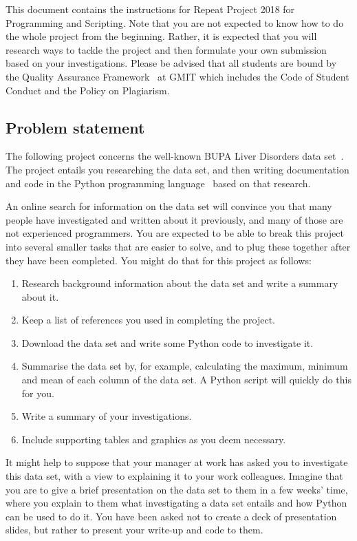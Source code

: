 \documentclass[12pt, a4paper, hidelinks]{scrartcl}
\title{\projectname}
\author{\modulename}
\date{Due: \duedate}
\newcommand{\modulename}{Programming and Scripting}
\newcommand{\projectyear}{2018}
\newcommand{\projectname}{Repeat Project \projectyear}
\begin{document}
  
\maketitle

\noindent
This document contains the instructions for \projectname{} for \modulename{}.
Note that you are not expected to know how to do the whole project from the beginning.
Rather, it is expected that you will research ways to tackle the project and then formulate your own submission based on your investigations.
Please be advised that all students are bound by the Quality Assurance Framework~\cite{gmitqaf} at GMIT which includes the Code of Student Conduct and the Policy on Plagiarism.

\subsection*{Problem statement}
  The following project concerns the well-known BUPA Liver Disorders data set~\cite{liverdataset}.
  The project entails you researching the data set, and then writing documentation and code in the Python programming language~\cite{pythonwebsite} based on that research.
  
  An online search for information on the data set will convince you that many people have investigated and written about it previously, and many of those are not experienced programmers.
  You are expected to be able to break this project into several smaller tasks that are easier to solve, and to plug these together after they have been completed.
  You might do that for this project as follows:
  \begin{enumerate}
    \item Research background information about the data set and write a summary about it.
    \item Keep a list of references you used in completing the project.
    \item Download the data set and write some Python code to investigate it.
    \item Summarise the data set by, for example, calculating the maximum, minimum and mean of each column of the data set. A Python script will quickly do this for you.
    \item Write a summary of your investigations.
    \item Include supporting tables and graphics as you deem necessary.
  \end{enumerate}

  It might help to suppose that your manager at work has asked you to investigate this data set, with a view to explaining it to your work colleagues.
  Imagine that you are to give a brief presentation on the data set to them in a few weeks' time, where you explain to them what investigating a data set entails and how Python can be used to do it.
  You have been asked not to create a deck of presentation slides, but rather to present your write-up and code to them.
\end{document}
